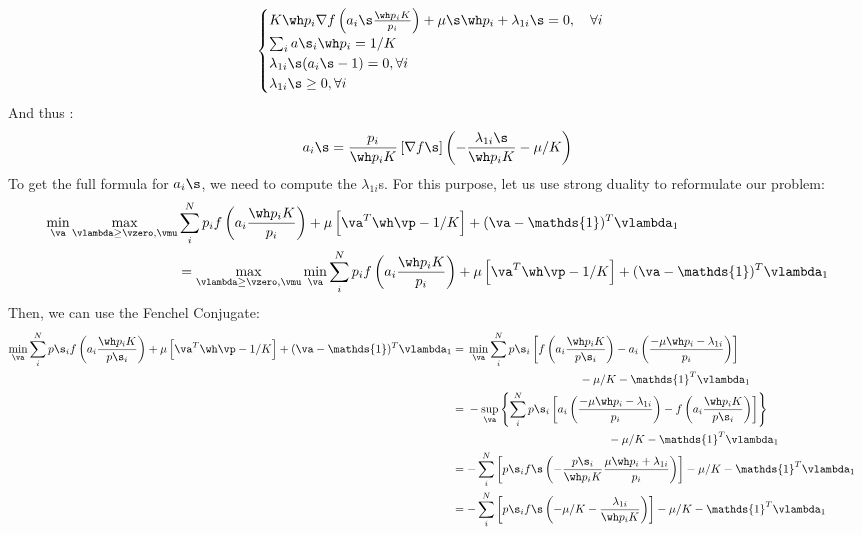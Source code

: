 \documentclass[twoside]{article}
\begin{document}
\begin{equation}
 \begin{cases}
K\wh p_i \nabla f\left(a_i\s \frac{\wh p_iK}{p_i }\right) + \mu\s \wh p_i  +\lambda_{1i}\s = 0,  \quad \forall i \\
\sum_i a\s_i \wh p_i= 1/ K \\
\lambda_{1i}\s (a_i\s-1)=0, \forall i \\
\lambda_{1i}\s\geq 0, \forall i
\end{cases}
\end{equation}
And thus :
\begin{align}
\label{eq:aifs}
    a_i\s= \frac{p_i }{\wh p_i K } \left[\nabla f\s
    \right]\left(-
    \frac{\lambda_{1i}\s}{\wh p_iK} - \mu/K\right)
\end{align}
To get the full formula for $a_i\s$, we need to compute the $\lambda_{1i}$s. For this purpose, let us use strong duality to reformulate our problem:
\begin{align}
    \min_{\va} \max_{\vlambda \geq \vzero, \vmu} &\sum_i^N p_if\left(a_i  \frac{\wh p_iK}{p_i }\right) + \mu \left[ \va^T \wh \vp- 1/K\right] + (\va-\mathds{1})^T\vlambda_1 \\
    &= \max_{\vlambda \geq \vzero, \vmu}  \min_{\va}\sum_i^N p_if\left(a_i \frac{\wh p_iK}{p_i }\right) + \mu \left[ \va^T \wh \vp- 1/K\right] + (\va-\mathds{1})^T\vlambda_1
\end{align}
Then, we can use the Fenchel Conjugate:
\begin{align}
	\begin{split}
		\min_{\va}\sum_{i}^{N}p\s_{i}f\left(a_i\frac{\wh p_{i}K}{p\s_{i}}\right)+\mu\left[\va^{T}\wh\vp-1/K\right]+(\va-\mathds{1})^{T}\vlambda_{1} & = \begin{multlined}[t]\min_{\va}\sum_{i}^{N}p\s_{i}\left[f\left(a_i\frac{\wh p_{i}K}{p\s_{i}}\right)-a_{i} \left(\frac{-\mu\wh p_{i}-\lambda_{1i}}{p_i}\right)\right]\\
 -\mu /K-\mathds{1}^{T}\vlambda_{1} \end{multlined}\\
		 & =\begin{multlined}[t]-\sup_{\va}\left\{ \sum_{i}^{N}p\s_{i}\left[a_{i}\left(\frac{-\mu\wh p_{i}-\lambda_{1i}}{p_i}\right)-f\left(a_i\frac{\wh p_{i}K}{p\s_{i}}\right)\right]\right\} \\ -\mu /K-\mathds{1}^{T}\vlambda_{1}\end{multlined} \\
	 & =-\sum_{i}^{N}\left[p\s_{i}f\s\left(-\frac{p\s_{i}}{\wh p_{i}K}\frac{\mu\wh p_{i}+\lambda_{1i}}{p_i}\right)\right]-\mu /K-\mathds{1}^{T}\vlambda_{1}\\
 & =-\sum_{i}^{N}\left[p\s_{i}f\s\left(-\mu/K-\frac{\lambda_{1i}}{\wh p_{i}K}\right)\right]-\mu/ K-\mathds{1}^{T}\vlambda_{1}
    \end{split}
\end{align}
\end{document}
